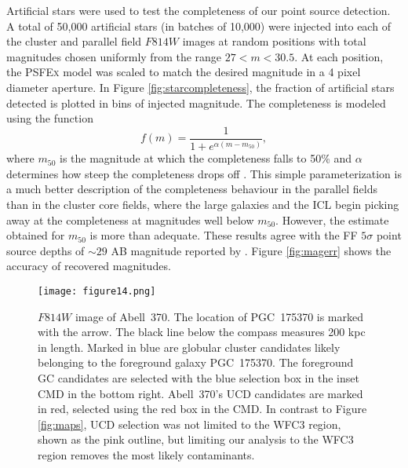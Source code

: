 \documentclass[iop,tighten,twocolumn,apj,floatfix]{emulateapj}
\begin{document}
Artificial stars were used to test the completeness of our point source
detection.
A total of 50,000 artificial stars (in batches of 10,000) were injected into
each of the cluster and parallel field $F814W$ images at random positions with
total magnitudes chosen uniformly from the range $27 < m < 30.5$.
At each position, the \textsc{PSFEx} model was scaled to match the desired
magnitude in a 4 pixel diameter aperture. 
In Figure \ref{fig:starcompleteness}, the fraction of artificial stars
detected is plotted in bins of injected magnitude. The completeness is modeled
using the function 
\begin{equation}
f(m) = \frac{1}{1 + e^{\alpha(m - m_{50})}},
\end{equation}
where $m_{50}$ is the magnitude at which the completeness falls to 50\% and $\alpha$
determines how steep the completeness drops off \citep{harris2016}.
This simple parameterization is a much better description of the completeness
behaviour in the parallel fields than in the cluster core fields, where the
large galaxies and the ICL begin picking away at the completeness at
magnitudes well below $m_{50}$.
However, the estimate obtained for $m_{50}$ is more than adequate.
These results agree with the FF $5\sigma$ point source depths of ${\sim}29$ AB
magnitude reported by \cite{lotz2017}. 
Figure \ref{fig:magerr} shows the accuracy of recovered magnitudes.
\\

\begin{figure*}
	\texttt{[image: figure14.png]}
	\caption{
    $F814W$ image of Abell~370.
    The location of PGC~175370 is marked with the arrow.
    The black line below the compass measures 200 kpc in length.
    Marked in blue are globular cluster candidates likely belonging to the
    foreground galaxy PGC~175370. 
    The foreground GC candidates are selected with the blue selection box in
    the inset CMD in the bottom right.
    Abell~370's UCD candidates are marked in red, selected using the red box
    in the CMD.
    In contrast to Figure \ref{fig:maps}, UCD selection was not limited to the
    WFC3 region, shown as the pink outline, but limiting our analysis to the
    WFC3 region removes the most likely contaminants.
    \label{fig:pgc175370}
    }
\end{figure*}


\end{document}
